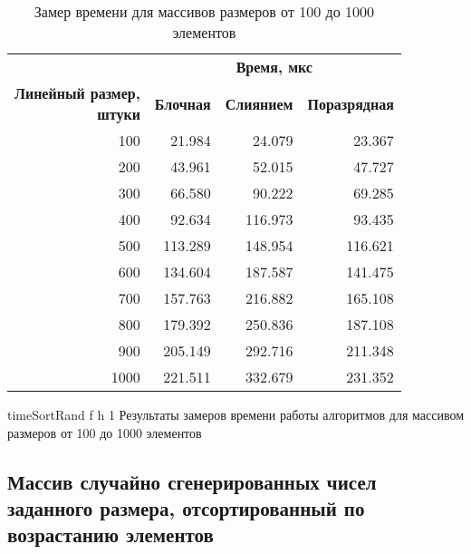 \clearpage

\begin{table}[ht]
	\small
	\begin{center}
		\begin{threeparttable}
			\caption{Замер времени для массивов размеров от 100 до 1000 элементов}
			\label{tbl:timeRand}
			\begin{tabular}{|r|r|r|r|}
				\hline
				& \multicolumn{3}{c|}{\bfseries Время, мкс} \\ \cline{2-4}
				\bfseries \makecell{Линейный размер, \\ штуки} & \bfseries Блочная & \bfseries Слиянием & \bfseries Поразрядная \\ \cline{2-4}
				\hline
				100 & 21.984 & 24.079 & 23.367 \\
				\hline
				200 & 43.961 & 52.015 & 47.727 \\
				\hline
				300 & 66.580 & 90.222 & 69.285 \\
				\hline
				400 & 92.634 & 116.973 & 93.435 \\
				\hline
				500 & 113.289 & 148.954 & 116.621 \\
				\hline
				600 & 134.604 & 187.587 & 141.475 \\
				\hline
				700 & 157.763 & 216.882 & 165.108 \\
				\hline
				800 & 179.392 & 250.836 & 187.108 \\
				\hline
				900 & 205.149 & 292.716 & 211.348 \\
				\hline
				1000 & 221.511 & 332.679 & 231.352 \\
				\hline
			\end{tabular}	
		\end{threeparttable}
	\end{center}
\end{table}

{timeSortRand} %
{f} %
{h} %
{1\textwidth} %
{Результаты замеров времени работы алгоритмов для массивом размеров от 100 до 1000 элементов} %

\clearpage

\subsection{Массив случайно сгенерированных чисел заданного размера, отсортированный по возрастанию элементов}

